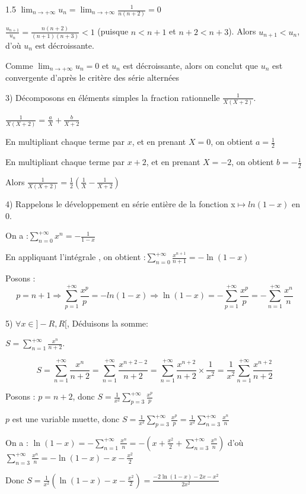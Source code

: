 \documentclass[12pt]{article}
\begin{document}
\begin{spacing}{1.5}
$\lim_{n\to +\infty}u_n=\lim_{n\to +\infty}\frac{1}{n(n+2)}=0$

$\frac{u_{n+1}}{u_n}=\frac{n(n+2)}{(n+1)(n+3)}< 1$ (puisque $n<n+1$ et $n+2<n+3$). Alors $u_{n+1}<u_n$, d'où $u_n$ est décroissante.

Comme $\lim_{n\to +\infty}u_n=0$ et $u_n$ est décroissante, alors on conclut que $u_n$ est convergente d'après le critère des série alternées



3) Décomposons en éléments simples la fraction rationnelle $\frac{1}{X(X+2)}$.

$\frac{1}{X(X+2)}=\frac{a}{X}+\frac{b}{X+2}$

En multipliant chaque terme par $x$, et en prenant $X=0$, on obtient $a=\frac{1}{2}$

En multipliant chaque terme par $x+2$, et en prenant $X=-2$, on obtient $b=-\frac{1}{2}$

Alors $\frac{1}{X(X+2)}=\frac{1}{2}(\frac{1}{X}-\frac{1}{X+2})$

4) Rappelons le développement en série entière de la fonction x$\longmapsto ln(1-x)$ en 0.

On a :$\sum_{n=0}^{+\infty}x^n=-\frac{1}{1-x}$

En appliquant l'intégrale , on obtient :$\sum_{n=0}^{+\infty}\frac{x^{n+1}}{n+1}=-\ln(1-x)$

Posons : \[p=n+1\Rightarrow \sum_{p=1}^{+\infty}\frac{x^p}{p}=-ln(1-x)\Rightarrow \ln(1-x)= -\sum_{p=1}^{+\infty}\frac{x^p}{p}=-\sum_{n=1}^{+\infty}\frac{x^n}{n}\]

5) $\forall x\in ]-R,R[$, Déduisons la somme:

$S=\sum_{n=1}^{+\infty}\frac{x^n}{n+2}$.

\[S=\sum_{n=1}^{+\infty}\frac{x^n}{n+2}=\sum_{n=1}^{+\infty}\frac{x^{n+2-2}}{n+2}=\sum_{n=1}^{+\infty}\frac{x^{n+2}}{n+2}\times\frac{1}{x^2}=\frac{1}{x^2}\sum_{n=1}^{+\infty}\frac{x^{n+2}}{n+2}\]

Posons : $p=n+2$, donc $S=\frac{1}{x^2}\sum_{p=3}^{+\infty}\frac{x^{p}}{p}$

$p$ est une variable muette, donc $S=\frac{1}{x^2}\sum_{p=3}^{+\infty}\frac{x^{p}}{p}=\frac{1}{x^2}\sum_{n=3}^{+\infty}\frac{x^{n}}{n}$


On a : $\ln(1-x)=-\sum_{n=1}^{+\infty}\frac{x^n}{n}=-\left( x+\frac{x^2}{2}+\sum_{n=3}^{+\infty}\frac{x^n}{n}\right)$ d'où  $\sum_{n=3}^{+\infty}\frac{x^n}{n}=-\ln(1-x)-x-\frac{x^2}{2}$

Donc $S=\frac{1}{x^2}\left(\ln(1-x)-x-\frac{x^2}{2}\right)=\frac{-2\ln(1-x)-2x-x^2}{2x^2}$



\end{spacing}
\end{document}
